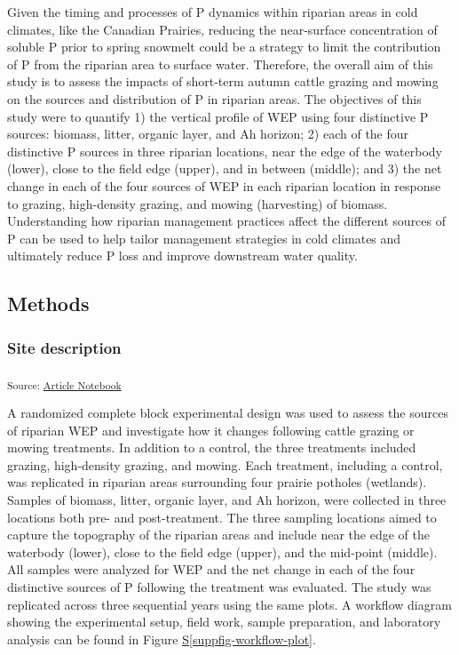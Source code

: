 \documentclass[
]{agujournal2019}
\newcommand*\quartosuppfigref[1]{Figure \hyperref[#1]{S\ref{#1}}}
\begin{document}
Given the timing and processes of P dynamics within riparian areas in
cold climates, like the Canadian Prairies, reducing the near-surface
concentration of soluble P prior to spring snowmelt could be a strategy
to limit the contribution of P from the riparian area to surface water.
Therefore, the overall aim of this study is to assess the impacts of
short-term autumn cattle grazing and mowing on the sources and
distribution of P in riparian areas. The objectives of this study were
to quantify 1) the vertical profile of WEP using four distinctive P
sources: biomass, litter, organic layer, and Ah horizon; 2) each of the
four distinctive P sources in three riparian locations, near the edge of
the waterbody (lower), close to the field edge (upper), and in between
(middle); and 3) the net change in each of the four sources of WEP in
each riparian location in response to grazing, high-density grazing, and
mowing (harvesting) of biomass. Understanding how riparian management
practices affect the different sources of P can be used to help tailor
management strategies in cold climates and ultimately reduce P loss and
improve downstream water quality.

\subsection{Methods}\label{methods}

\subsubsection{Site description}\label{site-description}

\textsubscript{Source:
\href{https://alex-koiter.github.io/riparian-grazing-manuscript/index.qmd.html}{Article
Notebook}}

A randomized complete block experimental design was used to assess the
sources of riparian WEP and investigate how it changes following cattle
grazing or mowing treatments. In addition to a control, the three
treatments included grazing, high-density grazing, and mowing. Each
treatment, including a control, was replicated in riparian areas
surrounding four prairie potholes (wetlands). Samples of biomass,
litter, organic layer, and Ah horizon, were collected in three locations
both pre- and post-treatment. The three sampling locations aimed to
capture the topography of the riparian areas and include near the edge
of the waterbody (lower), close to the field edge (upper), and the
mid-point (middle). All samples were analyzed for WEP and the net change
in each of the four distinctive sources of P following the treatment was
evaluated. The study was replicated across three sequential years using
the same plots. A workflow diagram showing the experimental setup, field
work, sample preparation, and laboratory analysis can be found in
\quartosuppfigref{suppfig-workflow-plot}.
\end{document}
